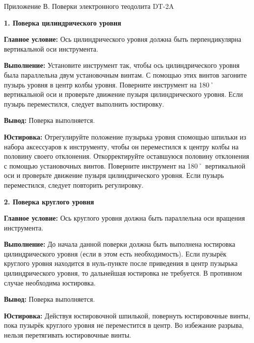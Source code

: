 \documentclass[a4paper]{article}
\begin{document}
\begin{newpage}

    \begin{flushright}
        Приложение В. Поверки электронного теодолита DT-2A
    \end{flushright}
    \large{
        \par\textbf{1. Поверка цилиндрического уровня}
        \par\textbf{Главное условие:} Ось цилиндрического уровня должна быть перпендикулярна вертикальной оси инструмента.
        \par\textbf{Выполнение:} Установите инструмент так, чтобы ось
        цилиндрического уровня была параллельна двум установочным
        винтам. С помощью этих винтов загоните пузырь уровня в центр
        колбы уровня. Поверните инструмент на 180˚ вертикальной оси и проверьте
        движение пузыря цилиндрического уровня. Если пузырь переместился, следует выполнить юстировку.
        \par\textbf{Вывод:} Поверка выполняется.
        \par\textbf{Юстировка:} Отрегулируйте положение пузырька уровня спомощью шпильки из набора аксессуаров к инструменту, чтобы он переместился к центру колбы на половину своего отклонения. Откорректируйте оставшуюся половину отклонения с помощью установочных винтов. Поверните инструмент на 180˚ вертикальной оси и проверьте движение пузыря цилиндрического уровня. Если пузырь переместился, следует повторить регулировку.\\
    
        \par\textbf{2. Поверка круглого уровня}
        \par\textbf{Главное условие:} Ось круглого уровня должна быть параллельна оси вращения инструмента.
        \par\textbf{Выполнение:} До начала данной поверки должна
        быть выполнена юстировка цилиндрического уровня (если в этом
        есть необходимость). Если пузырёк круглого уровня находится в
        нуль-пункте после приведения в центр пузырька цилиндрического уровня, то дальнейшая юстировка не требуется. В противном случае необходима юстировка.
        \par\textbf{Вывод:} Поверка выполняется.
        \par\textbf{Юстировка:} Действуя юстировочной шпилькой, повернуть
        юстировочные винты, пока пузырёк круглого уровня не переместится в центр. Во избежание разрыва, нельзя перетягивать юстировочные винты.\\
    
}
\end{newpage}
\end{document}
